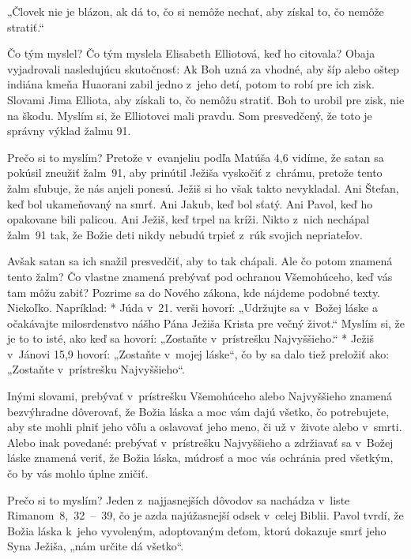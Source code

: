 „Človek nie je blázon, ak dá to, čo si nemôže nechať, aby získal to, čo nemôže stratiť.“

Čo tým myslel? Čo tým myslela Elisabeth Elliotová, keď ho citovala? Obaja vyjadrovali nasledujúcu skutočnosť: Ak Boh uzná za vhodné, aby šíp alebo oštep indiána kmeňa Huaorani zabil jedno z~jeho detí, potom to robí pre ich zisk. Slovami Jima Elliota, aby získali to, čo nemôžu stratiť. Boh to urobil pre zisk, nie na škodu. Myslím si, že Elliotovci mali pravdu. Som presvedčený, že toto je správny výklad žalmu 91.

Prečo si to myslím? Pretože v~evanjeliu podľa Matúša 4,6 vidíme, že satan sa pokúsil zneužiť žalm~91, aby prinútil Ježiša vyskočiť z~chrámu, pretože tento žalm sľubuje, že nás anjeli ponesú. Ježiš si ho však takto nevykladal. Ani Štefan, keď bol ukameňovaný na smrť. Ani Jakub, keď bol sťatý. Ani Pavol, keď ho opakovane bili palicou. Ani Ježiš, keď trpel na kríži. Nikto z~nich nechápal žalm~91 tak, že Božie deti nikdy nebudú trpieť z~rúk svojich nepriateľov.


Avšak satan sa ich snažil presvedčiť, aby to tak chápali. Ale čo potom znamená tento žalm? Čo vlastne znamená prebývať pod ochranou Všemohúceho, keď vás tam môžu zabiť? Pozrime sa do Nového zákona, kde nájdeme podobné texty. Niekoľko. Napríklad:
\begitems
* Júda v~21. verši hovorí: „Udržujte sa v~Božej láske a očakávajte milosrdenstvo nášho Pána Ježiša Krista pre večný život.“ Myslím si, že je to to isté, ako keď sa hovorí: „Zostaňte v~prístrešku Najvyššieho.“
* Ježiš v~Jánovi 15,9 hovorí: „Zostaňte v~mojej láske“, čo by sa dalo tiež preložiť ako: „Zostaňte v~prístrešku Najvyššieho“.
\enditems

Inými slovami, prebývať v~prístrešku Všemohúceho alebo Najvyššieho znamená bezvýhradne dôverovať, že Božia láska a moc vám dajú všetko, čo potrebujete, aby ste mohli plniť jeho vôľu a oslavovať jeho meno, či už v~živote alebo v~smrti. Alebo inak povedané: prebývať v~prístrešku Najvyššieho a zdržiavať sa v~Božej láske znamená veriť, že Božia láska, múdrosť a moc vás ochránia pred všetkým, čo by vás mohlo úplne zničiť.


Prečo si to myslím? Jeden z~najjasnejších dôvodov sa nachádza v~liste Rimanom~8,~32~--~39, čo je azda najúžasnejší odsek v~celej Biblii. Pavol tvrdí, že Božia láska k~jeho vyvoleným, adoptovaným deťom, ktorú dokazuje smrť jeho Syna Ježiša, „nám určite dá všetko“.

